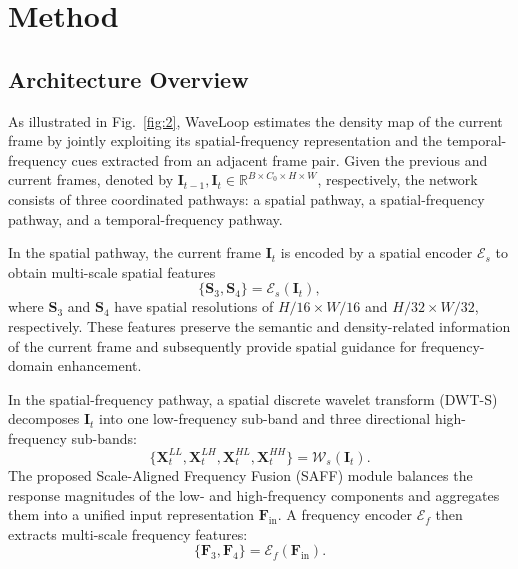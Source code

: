 \documentclass[lettersize,journal]{IEEEtran}
\begin{document}
\section{Method}
\subsection{Architecture Overview}
\label{Waveloop}
As illustrated in Fig.~\ref{fig:2}, WaveLoop estimates the density map of the current frame by jointly exploiting its spatial-frequency representation and the temporal-frequency cues extracted from an adjacent frame pair. Given the previous and current frames, denoted by $\mathbf{I}_{t-1},\mathbf{I}_{t}\in\mathbb{R}^{B\times C_0\times H\times W}$, respectively, the network consists of three coordinated pathways: a spatial pathway, a spatial-frequency pathway, and a temporal-frequency pathway.

In the spatial pathway, the current frame $\mathbf{I}_{t}$ is encoded by a spatial encoder $\mathcal{E}_{s}$ to obtain multi-scale spatial features
\begin{equation}
\{\mathbf{S}_{3},\mathbf{S}_{4}\}
=
\mathcal{E}_{s}(\mathbf{I}_{t}),
\end{equation}
where $\mathbf{S}_{3}$ and $\mathbf{S}_{4}$ have spatial resolutions of $H/16\times W/16$ and $H/32\times W/32$, respectively. These features preserve the semantic and density-related information of the current frame and subsequently provide spatial guidance for frequency-domain enhancement.

In the spatial-frequency pathway, a spatial discrete wavelet transform (DWT-S) decomposes $\mathbf{I}_{t}$ into one low-frequency sub-band and three directional high-frequency sub-bands:
\begin{equation}
\{\mathbf{X}_{t}^{LL},\mathbf{X}_{t}^{LH},
\mathbf{X}_{t}^{HL},\mathbf{X}_{t}^{HH}\}
=
\mathcal{W}_{s}(\mathbf{I}_{t}).
\end{equation}
The proposed Scale-Aligned Frequency Fusion (SAFF) module balances the response magnitudes of the low- and high-frequency components and aggregates them into a unified input representation $\mathbf{F}_{\mathrm{in}}$. A frequency encoder $\mathcal{E}_{f}$ then extracts multi-scale frequency features:
\begin{equation}
\{\mathbf{F}_{3},\mathbf{F}_{4}\}
=
\mathcal{E}_{f}(\mathbf{F}_{\mathrm{in}}).
\end{equation}
\end{document}
